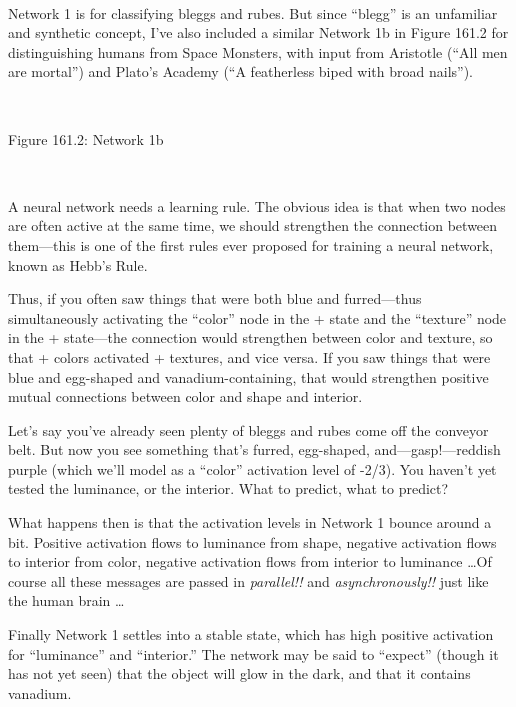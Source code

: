 \bigskip

{
 ~}

{
 Network 1 is for classifying bleggs and rubes. But since
``blegg'' is an unfamiliar and
synthetic concept, I've also included a similar Network
1b in Figure 161.2 for distinguishing humans from Space Monsters, with
input from Aristotle (``All men are
mortal'') and Plato's Academy
(``A featherless biped with broad
nails'').}

{
 ~}

{\centering
{}
 \newline
 Figure 161.2: Network 1b
\par}


\bigskip

{
 ~}

{
 A neural network needs a learning rule. The obvious idea is that
when two nodes are often active at the same time, we should strengthen
the connection between them---this is one of the first rules ever
proposed for training a neural network, known as Hebb's
Rule.}

{
 Thus, if you often saw things that were both blue and
furred---thus simultaneously activating the
``color'' node in the + state and
the ``texture'' node in the +
state---the connection would strengthen between color and texture, so
that + colors activated + textures, and vice versa. If you saw things
that were blue and egg-shaped and vanadium-containing, that would
strengthen positive mutual connections between color and shape and
interior.}

{
 Let's say you've already seen
plenty of bleggs and rubes come off the conveyor belt. But now you see
something that's furred, egg-shaped,
and---gasp!---reddish purple (which we'll model as a
``color'' activation level of -2/3).
You haven't yet tested the luminance, or the interior.
What to predict, what to predict?}

{
 What happens then is that the activation levels in Network 1
bounce around a bit. Positive activation flows to luminance from shape,
negative activation flows to interior from color, negative activation
flows from interior to luminance \ldots Of course all these messages are
passed in \textit{parallel!!} and \textit{asynchronously!!} just like
the human brain \ldots}

{
 Finally Network 1 settles into a stable state, which has high
positive activation for
``luminance'' and
``interior.'' The network may be
said to ``expect'' (though it has
not yet seen) that the object will glow in the dark, and that it
contains vanadium.}

